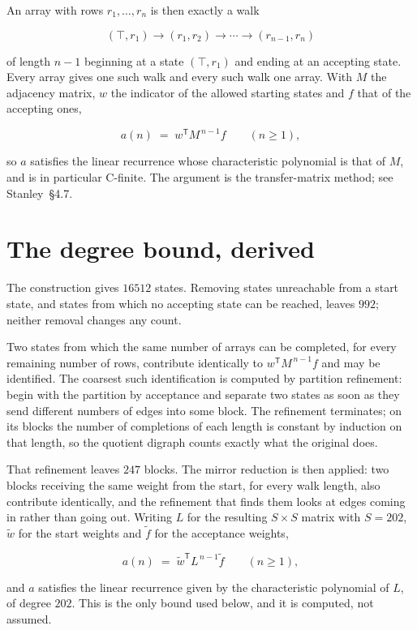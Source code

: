 \documentclass[11pt]{article}
\theoremstyle{definition}
\begin{document}
An array with rows $r_1,\dots,r_n$ is then exactly a walk

\[(\top,r_1) \to (r_1,r_2) \to \cdots \to (r_{n-1},r_n)\]

of length $n-1$ beginning at a state $(\top,r_1)$ and ending at an accepting state. Every array gives one such walk and every such walk one array. With $M$ the adjacency matrix, $w$ the indicator of the allowed starting states and $f$ that of the accepting ones,

\[a(n) \;=\; w^{\mathsf T} M^{\,n-1} f \qquad (n \ge 1),\]

so $a$ satisfies the linear recurrence whose characteristic polynomial is that of $M$, and is in particular C-finite. The argument is the transfer-matrix method; see Stanley~\S4.7.

\section{The degree bound, derived}

The construction gives $16512$ states. Removing states unreachable from a start state, and states from which no accepting state can be reached, leaves $992$; neither removal changes any count.

Two states from which the same number of arrays can be completed, for every remaining number of rows, contribute identically to $w^{\mathsf T}M^{\,n-1}f$ and may be identified. The coarsest such identification is computed by partition refinement: begin with the partition by acceptance and separate two states as soon as they send different numbers of edges into some block. The refinement terminates; on its blocks the number of completions of each length is constant by induction on that length, so the quotient digraph counts exactly what the original does.

That refinement leaves $247$ blocks. The mirror reduction is then applied: two blocks receiving the same weight from the start, for every walk length, also contribute identically, and the refinement that finds them looks at edges coming in rather than going out. Writing $L$ for the resulting $S \times S$ matrix with $S = 202$, $\tilde w$ for the start weights and $\tilde f$ for the acceptance weights,

\[a(n) \;=\; \tilde w^{\mathsf T} L^{\,n-1} \tilde f \qquad (n \ge 1),\]

and $a$ satisfies the linear recurrence given by the characteristic polynomial of $L$, of degree $202$. This is the only bound used below, and it is computed, not assumed.
\end{document}
